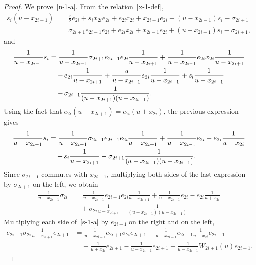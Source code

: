 \documentclass[11pt,a4paper,reqno,svgnames]{amsart}
\theoremstyle{plain}
\theoremstyle{definition}
\numberwithin{equation}{section}
\begin{document}
\begin{proof}
We prove~\eqref{n-1-a}. From the relation~\eqref{x-1-def}, 
\begin{align*}
s_i(u-x_{2i+1})&={\textstyle{\frac{z}{2}}}e_{2i}+s_ix_{2i}e_{2i}+e_{2i}x_{2i}+x_{2i-1}e_{2i}+(u-x_{2i-1})s_i-\sigma_{2i+1}\\
&=\sigma_{2i+1}e_{2i-1}e_{2i}+e_{2i}x_{2i}+x_{2i-1}e_{2i}+(u-x_{2i-1})s_i-\sigma_{2i+1},
\end{align*}
and 
\begin{align*}
\frac{1}{u-x_{2i-1}}s_i
&=\frac{1}{u-x_{2i-1}}\sigma_{2i+1}e_{2i-1}e_{2i}\frac{1}{u-x_{2i+1}}
+\frac{1}{u-x_{2i-1}}e_{2i}x_{2i}\frac{1}{u-x_{2i+1}}\\
&\quad-e_{2i}\frac{1}{u-x_{2i+1}}
+\frac{u}{u-x_{2i-1}}e_{2i}\frac{1}{u-x_{2i+1}}+s_i\frac{1}{u-x_{2i+1}}\notag\\
&\quad-\sigma_{2i+1}\frac{1}{(u-x_{2i+1})(u-x_{2i-1})}.\notag
\end{align*}
Using the fact that $e_{2i}(u-x_{2i+1})=e_{2i}(u+x_{2i})$, the previous expression gives 
\begin{align*}
\frac{1}{u-x_{2i-1}}s_i&=\frac{1}{u-x_{2i-1}}\sigma_{2i+1}e_{2i-1}e_{2i}\frac{1}{u-x_{2i+1}}+\frac{1}{u-x_{2i-1}}e_{2i} - e_{2i}\frac{1}{u+x_{2i}}\\
&\quad+s_i\frac{1}{u-x_{2i+1}}-\sigma_{2i+1}\frac{1}{(u-x_{2i+1})(u-x_{2i-1})}.\notag
\end{align*}
Since $\sigma_{2i+1}$ commutes with $x_{2i-1}$, multiplying both sides of the last expression by $\sigma_{2i+1}$ on the left, we obtain 
\begin{equation}\label{s-1-a}
\begin{split}
\frac{1}{u-x_{2i-1}}\sigma_{2i}&=\frac{1}{u-x_{2i-1}}e_{2i-1}e_{2i}\frac{1}{u-x_{2i+1}}+\frac{1}{u-x_{2i-1}}e_{2i} - e_{2i}\frac{1}{u+x_{2i}}\\
&\quad+\sigma_{2i}\frac{1}{u-x_{2i+1}}-\frac{1}{(u-x_{2i+1})(u-x_{2i-1})}
\end{split}
\end{equation}
Multiplying each side of~\eqref{s-1-a} by $e_{2i+1}$ on the right and on the left,
\begin{equation}\label{s-1-b}
\begin{split}
e_{2i+1}\sigma_{2i}\frac{1}{u-x_{2i+1}}e_{2i+1}
&=\frac{1}{u-x_{2i-1}}e_{2i+1}\sigma_{2i}e_{2i+1}
-\frac{1}{u-x_{2i-1}}e_{2i-1}\frac{1}{u+x_{2i}}e_{2i+1}\\
&\quad+\frac{1}{u+x_{2i}}e_{2i+1}-\frac{1}{u-x_{2i-1}}e_{2i+1}
+\frac{1}{u-x_{2i-1}}{W_{2i+1}(u)}e_{2i+1}.

\end{split}
\end{equation}
\end{proof}
\end{document}
